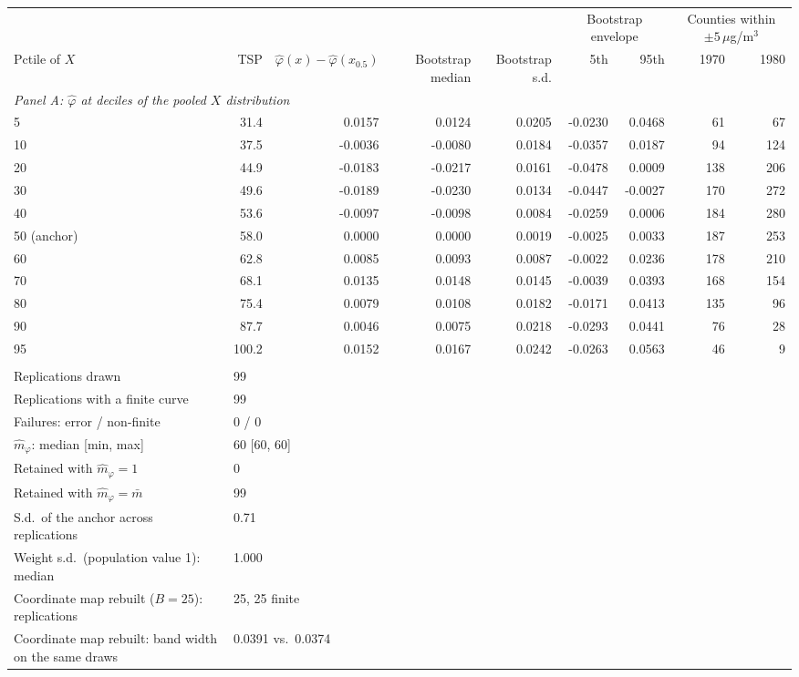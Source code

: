 \begin{tabular}{lrrrrrrrr}
\toprule
& & & & & \multicolumn{2}{c}{Bootstrap envelope} & \multicolumn{2}{c}{Counties within $\pm5\,\mu$g/m$^3$} \\
\cmidrule(lr){6-7} \cmidrule(lr){8-9}
Pctile of $X$ & TSP & $\hat\varphi(x)-\hat\varphi(x_{0.5})$ & Bootstrap median & Bootstrap s.d. & 5th & 95th & 1970 & 1980 \\
\midrule
\multicolumn{9}{l}{\textit{Panel A: $\hat\varphi$ at deciles of the pooled $X$ distribution}} \\
\midrule
5 & 31.4 & 0.0157 & 0.0124 & 0.0205 & -0.0230 & 0.0468 & 61 & 67 \\
10 & 37.5 & -0.0036 & -0.0080 & 0.0184 & -0.0357 & 0.0187 & 94 & 124 \\
20 & 44.9 & -0.0183 & -0.0217 & 0.0161 & -0.0478 & 0.0009 & 138 & 206 \\
30 & 49.6 & -0.0189 & -0.0230 & 0.0134 & -0.0447 & -0.0027 & 170 & 272 \\
40 & 53.6 & -0.0097 & -0.0098 & 0.0084 & -0.0259 & 0.0006 & 184 & 280 \\
50 (anchor) & 58.0 & 0.0000 & 0.0000 & 0.0019 & -0.0025 & 0.0033 & 187 & 253 \\
60 & 62.8 & 0.0085 & 0.0093 & 0.0087 & -0.0022 & 0.0236 & 178 & 210 \\
70 & 68.1 & 0.0135 & 0.0148 & 0.0145 & -0.0039 & 0.0393 & 168 & 154 \\
80 & 75.4 & 0.0079 & 0.0108 & 0.0182 & -0.0171 & 0.0413 & 135 & 96 \\
90 & 87.7 & 0.0046 & 0.0075 & 0.0218 & -0.0293 & 0.0441 & 76 & 28 \\
95 & 100.2 & 0.0152 & 0.0167 & 0.0242 & -0.0263 & 0.0563 & 46 & 9 \\
\addlinespace
\multicolumn{9}{l}{\textit{Panel B: multiplier design and convergence}} \\
\midrule
Replications drawn & \multicolumn{8}{l}{99} \\
Replications with a finite curve & \multicolumn{8}{l}{99} \\
Failures: error / non-finite & \multicolumn{8}{l}{0 / 0} \\
$\hat m_\varphi$: median [min, max] & \multicolumn{8}{l}{60 [60, 60]} \\
Retained with $\hat m_\varphi = 1$ & \multicolumn{8}{l}{0} \\
Retained with $\hat m_\varphi = \bar m$ & \multicolumn{8}{l}{99} \\
S.d.\ of the anchor across replications & \multicolumn{8}{l}{0.71} \\
Weight s.d.\ (population value 1): median & \multicolumn{8}{l}{1.000} \\
\addlinespace
Coordinate map rebuilt ($B=25$): replications & \multicolumn{8}{l}{25, 25 finite} \\
Coordinate map rebuilt: band width on the same draws & \multicolumn{8}{l}{0.0391 vs.\ 0.0374} \\
\bottomrule
\end{tabular}
